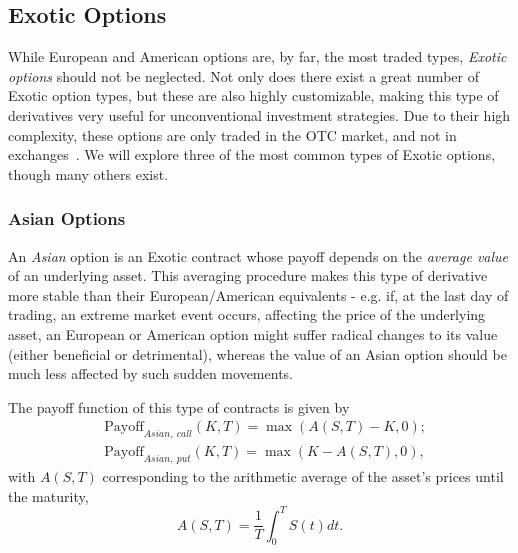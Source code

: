 



\subsection{Exotic Options}
While European and American options are, by far, the most traded types, \emph{Exotic options} should not be neglected. Not only does there exist a great number of Exotic option types, but these are also highly customizable, making this type of derivatives very useful for unconventional investment strategies. Due to their high complexity, these options are only traded in the OTC market, and not in exchanges~\cite{InvExotic}. We will explore three of the most common types of Exotic options, though many others exist.

\subsubsection{Asian Options}
An \emph{Asian} option is an Exotic contract whose payoff depends on the \emph{average value} of an underlying asset. This averaging procedure makes this type of derivative more stable than their European/American equivalents - e.g. if, at the last day of trading, an extreme market event occurs, affecting the price of the underlying asset, an European or American option might suffer radical changes to its value (either beneficial or detrimental), whereas the value of an Asian option should be much less affected by such sudden movements.

The payoff function of this type of contracts is given by
\begin{equation}\label{asian}
\begin{split}
&\text{Payoff}_{Asian,\ call}(K,T)=\max\left(A(S,T)-K,0\right);\\
&\text{Payoff}_{Asian,\ put}(K,T)=\max\left(K-A(S,T),0\right),
\end{split}
\end{equation}
\noindent with $A(S,T)$ corresponding to the arithmetic average of the asset's prices until the maturity,
\begin{equation}\label{avg}
A(S,T)=\frac{1}{T}\int_0^TS(t)dt.
\end{equation}

